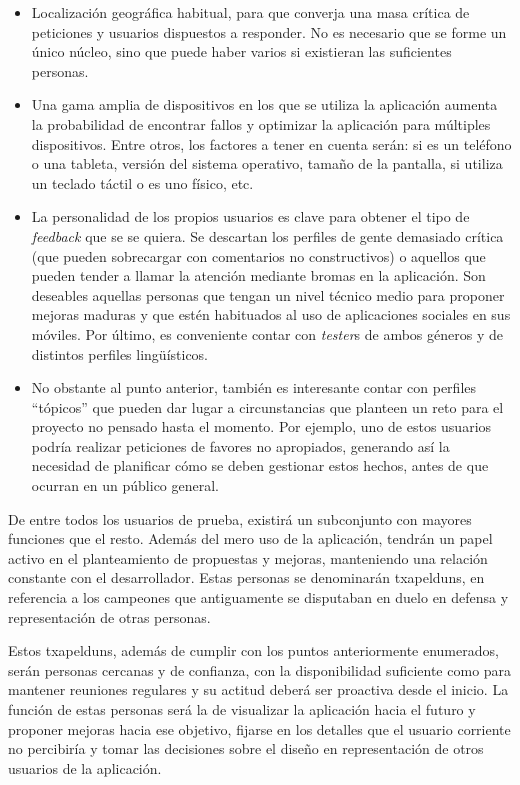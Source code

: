 \documentclass[main]{subfiles}
\begin{document}
\begin{itemize}
  \item Localización geográfica habitual, para que converja una masa crítica de peticiones y usuarios dispuestos a responder. No es necesario que se forme un único núcleo, sino que puede haber varios si existieran las suficientes personas.
  \item Una gama amplia de dispositivos en los que se utiliza la aplicación aumenta la probabilidad de encontrar fallos y optimizar la aplicación para múltiples dispositivos. Entre otros, los factores a tener en cuenta serán: si es un teléfono o una tableta, versión del sistema operativo, tamaño de la pantalla, si utiliza un teclado táctil o es uno físico, etc.
  \item La personalidad de los propios usuarios es clave para obtener el tipo de \emph{feedback} que se se quiera. Se descartan los perfiles de gente demasiado crítica (que pueden sobrecargar con comentarios no constructivos) o aquellos que pueden tender a llamar la atención mediante bromas en la aplicación. Son deseables aquellas personas que tengan un nivel técnico medio para proponer mejoras maduras y que estén habituados al uso de aplicaciones sociales en sus móviles. Por último, es conveniente contar con \emph{tester}s de ambos géneros y de distintos perfiles lingüísticos.
  \item No obstante al punto anterior, también es interesante contar con perfiles \enquote{tópicos} que pueden dar lugar a circunstancias que planteen un reto para el proyecto no pensado hasta el momento. Por ejemplo, uno de estos usuarios podría realizar peticiones de favores no apropiados, generando así la necesidad de planificar cómo se deben gestionar estos hechos, antes de que ocurran en un público general.
\end{itemize}

De entre todos los usuarios de prueba, existirá un subconjunto con mayores funciones que el resto. Además del mero uso de la aplicación, tendrán un papel activo en el planteamiento de propuestas y mejoras, manteniendo una relación constante con el desarrollador. Estas personas se denominarán \glspl{txapeldun}, en referencia a los campeones que antiguamente se disputaban en duelo en defensa y representación de otras personas.

Estos \glspl{txapeldun}, además de cumplir con los puntos anteriormente enumerados, serán personas cercanas y de confianza, con la disponibilidad suficiente como para mantener reuniones regulares y su actitud deberá ser proactiva desde el inicio. La función de estas personas será la de visualizar la aplicación hacia el futuro y proponer mejoras hacia ese objetivo, fijarse en los detalles que el usuario corriente no percibiría y tomar las decisiones sobre el diseño en representación de otros usuarios de la aplicación.
\end{document}
